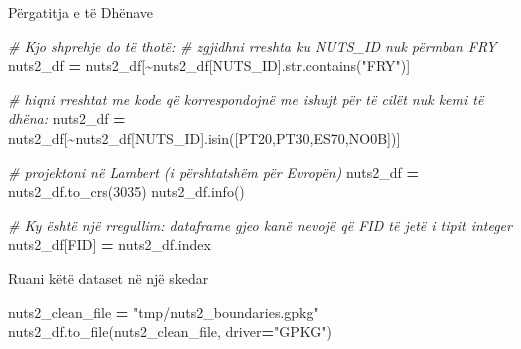 \documentclass[
  ignorenonframetext,
]{beamer}
\newenvironment{Shaded}{\begin{snugshade}}{\end{snugshade}}
\newcommand{\BuiltInTok}[1]{#1}
\newcommand{\CommentTok}[1]{\textcolor[rgb]{0.56,0.35,0.01}{\textit{#1}}}
\newcommand{\DecValTok}[1]{\textcolor[rgb]{0.00,0.00,0.81}{#1}}
\newcommand{\NormalTok}[1]{#1}
\newcommand{\OperatorTok}[1]{\textcolor[rgb]{0.81,0.36,0.00}{\textbf{#1}}}
\newcommand{\StringTok}[1]{\textcolor[rgb]{0.31,0.60,0.02}{#1}}
\begin{document}
\begin{frame}[fragile]{Përgatitja e të Dhënave}
\protect\hypertarget{puxebrgatitja-e-tuxeb-dhuxebnave-3}{}

\begin{Shaded}
\begin{Highlighting}[]
\CommentTok{\# Kjo shprehje do të thotë:}
\CommentTok{\# zgjidhni rreshta ku NUTS\_ID nuk përmban \textquotesingle{}FRY\textquotesingle{}}
\NormalTok{nuts2\_df }\OperatorTok{=}\NormalTok{ nuts2\_df[}\OperatorTok{\textasciitilde{}}\NormalTok{nuts2\_df[}\StringTok{\textquotesingle{}NUTS\_ID\textquotesingle{}}\NormalTok{].}\BuiltInTok{str}\NormalTok{.contains(}\StringTok{"FRY"}\NormalTok{)]}

\CommentTok{\# hiqni rreshtat me kode që korrespondojnë me ishujt për të cilët nuk kemi të dhëna:}
\NormalTok{nuts2\_df }\OperatorTok{=}\NormalTok{ nuts2\_df[}\OperatorTok{\textasciitilde{}}\NormalTok{nuts2\_df[}\StringTok{\textquotesingle{}NUTS\_ID\textquotesingle{}}\NormalTok{].isin([}\StringTok{\textquotesingle{}PT20\textquotesingle{}}\NormalTok{,}\StringTok{\textquotesingle{}PT30\textquotesingle{}}\NormalTok{,}\StringTok{\textquotesingle{}ES70\textquotesingle{}}\NormalTok{,}\StringTok{\textquotesingle{}NO0B\textquotesingle{}}\NormalTok{])]}

\CommentTok{\# projektoni në Lambert (i përshtatshëm për Evropën)}
\NormalTok{nuts2\_df }\OperatorTok{=}\NormalTok{ nuts2\_df.to\_crs(}\DecValTok{3035}\NormalTok{)}
\NormalTok{nuts2\_df.info()}

\CommentTok{\# Ky është një rregullim: dataframe gjeo kanë nevojë që FID të jetë i tipit integer}
\NormalTok{nuts2\_df[}\StringTok{\textquotesingle{}FID\textquotesingle{}}\NormalTok{] }\OperatorTok{=}\NormalTok{ nuts2\_df.index}
\end{Highlighting}
\end{Shaded}
\end{frame}

\begin{frame}[fragile]{Ruani këtë dataset në një skedar}
\protect\hypertarget{ruani-kuxebtuxeb-dataset-nuxeb-njuxeb-skedar}{}

\begin{Shaded}
\begin{Highlighting}[]
\NormalTok{nuts2\_clean\_file }\OperatorTok{=} \StringTok{"tmp/nuts2\_boundaries.gpkg"}
\NormalTok{nuts2\_df.to\_file(nuts2\_clean\_file, driver}\OperatorTok{=}\StringTok{"GPKG"}\NormalTok{)}
\end{Highlighting}
\end{Shaded}
\end{frame}
\end{document}
